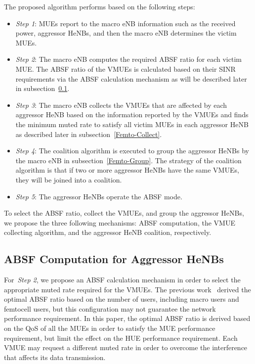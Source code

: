 \documentclass[paper]{ieice}
\begin{document}
The proposed algorithm performs based on the following steps:
\begin{itemize}
  \item \emph{Step 1}: MUEs report to the  macro eNB information such as the received power, aggressor HeNBs, and then the macro eNB determines the victim MUEs.
  \item \emph{Step 2}: The macro eNB computes the required ABSF ratio for each victim MUE. The ABSF ratio of the VMUEs is calculated based on their SINR requirements via the ABSF calculation mechanism as will be described later in subsection~\ref{ABSF-Sel}.
  \item \emph{Step 3}: The macro eNB collects the VMUEs that are affected by each aggressor HeNB based on the information reported by the VMUEs and finds the minimum muted rate to satisfy all victim MUEs in each aggressor HeNB as described later in subsection~\ref{Femto-Collect}.
  \item \emph{Step 4}: The coalition algorithm is executed to group the aggressor HeNBs by the  macro eNB in subsection~\ref{Femto-Group}. The strategy of the coalition algorithm is that if two or more aggressor HeNBs have the same VMUEs, they will be joined into a coalition.
  \item \emph{Step 5}: The aggressor HeNBs operate the ABSF mode.
\end{itemize}

To select the ABSF ratio, collect the VMUEs, and group the aggressor HeNBs, we propose the three following mechanisms: ABSF computation, the VMUE collecting algorithm, and the aggressor HeNB coalition, respectively.

\subsection{ABSF Computation for Aggressor HeNBs}
\label{ABSF-Sel}
For~\emph{Step 2}, we propose an ABSF calculation mechanism in order to select the appropriate muted rate required for the VMUEs. The previous work~\cite{Lembo2013,Cierny13} derived the optimal ABSF ratio based on the number of users, including macro users and femtocell users, but this configuration may not guarantee the network performance requirement. In this paper, the optimal ABSF ratio is derived based on the QoS of all the MUEs in order to satisfy the MUE performance requirement, but limit the effect on the HUE performance requirement. Each VMUE may request a different muted rate in order to overcome the interference that affects its data transmission.
\end{document}
